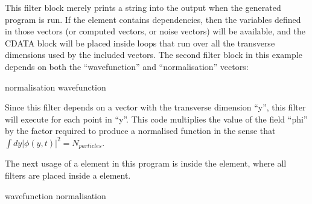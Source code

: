 \documentclass[letterpaper,10pt,english]{sphinxmanual}
\begin{document}
\begin{sphinxVerbatim}[commandchars=\\\{\}]
  \PYG{c+cp}{\PYGZlt{}![CDATA[}
  \PYG{c+cp}{]]\PYGZgt{}}
\end{sphinxVerbatim}

\sphinxAtStartPar
This filter block merely prints a string into the output when the generated program is run.  If the  element contains dependencies, then the variables defined in those vectors (or computed vectors, or noise vectors) will be available, and the CDATA block will be placed inside loops that run over all the transverse dimensions used by the included vectors.  The second filter block in this example depends on both the “wavefunction” and “normalisation” vectors:

\begin{sphinxVerbatim}[commandchars=\\\{\}]
    normalisation wavefunction
  \PYG{c+cp}{\PYGZlt{}![CDATA[}
      
  \PYG{c+cp}{]]\PYGZgt{}}
\end{sphinxVerbatim}

\sphinxAtStartPar
Since this filter depends on a vector with the transverse dimension “y”, this filter will execute for each point in “y”.  This code multiplies the value of the field “phi” by the factor required to produce a normalised function in the sense that  \(\int dy |\phi(y,t)|^2 = N_{particles}\).

\sphinxAtStartPar
The next usage of a  element in this program is inside the  element, where all filters are placed inside a  element.

\begin{sphinxVerbatim}[commandchars=\\\{\}]
 
    wavefunction normalisation
    \PYG{c+cp}{\PYGZlt{}![CDATA[}
        
    \PYG{c+cp}{]]\PYGZgt{}}
\end{sphinxVerbatim}
\end{document}
